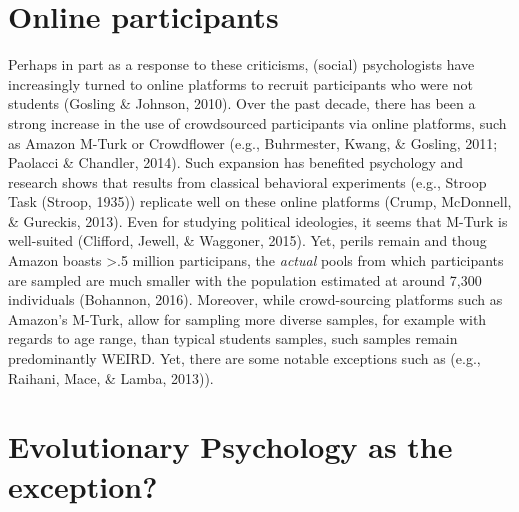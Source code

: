 \documentclass[english,man]{apa6}
\theoremstyle{definition}
\theoremstyle{definition}
\theoremstyle{remark}
\begin{document}
\section{Online participants}\label{online-participants}

Perhaps in part as a response to these criticisms, (social)
psychologists have increasingly turned to online platforms to recruit
participants who were not students (Gosling \& Johnson, 2010). Over the
past decade, there has been a strong increase in the use of crowdsourced
participants via online platforms, such as Amazon M-Turk or Crowdflower
(e.g., Buhrmester, Kwang, \& Gosling, 2011; Paolacci \& Chandler, 2014).
Such expansion has benefited psychology and research shows that results
from classical behavioral experiments (e.g., Stroop Task (Stroop, 1935))
replicate well on these online platforms (Crump, McDonnell, \& Gureckis,
2013). Even for studying political ideologies, it seems that M-Turk is
well-suited (Clifford, Jewell, \& Waggoner, 2015). Yet, perils remain
and thoug Amazon boasts \textgreater{}.5 million participans, the
\emph{actual} pools from which participants are sampled are much smaller
with the population estimated at around 7,300 individuals (Bohannon,
2016). Moreover, while crowd-sourcing platforms such as Amazon's M-Turk,
allow for sampling more diverse samples, for example with regards to age
range, than typical students samples, such samples remain predominantly
WEIRD. Yet, there are some notable exceptions such as (e.g., Raihani,
Mace, \& Lamba, 2013)).

\section{Evolutionary Psychology as the
exception?}\label{evolutionary-psychology-as-the-exception}
\end{document}
